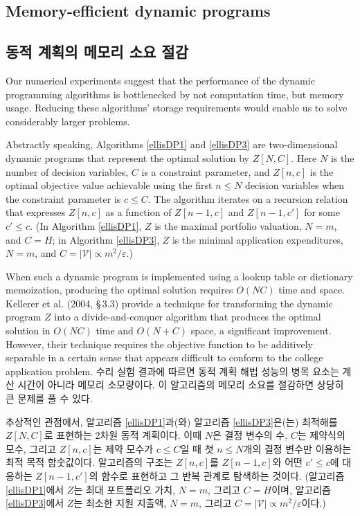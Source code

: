 \documentclass[11pt]{article} %
\theoremstyle{definition}
\theoremstyle{definition}
\begin{document}
\ifen \subsection{Memory-efficient dynamic programs}\else \subsection{동적 계획의 메모리 소요 절감}\fi
\ifen
Our numerical experiments suggest that the performance of the dynamic programming algorithms is bottlenecked by not computation time, but memory usage. Reducing these algorithms' storage requirements would enable us to solve considerably larger problems.

Abstractly speaking, Algorithms \ref{ellisDP1} and \ref{ellisDP3} are two-dimensional dynamic programs that represent the optimal solution by $Z[N, C]$. Here $N$ is the number of decision variables, $C$ is a constraint parameter, and $Z[n, c]$ is the optimal objective value achievable using the first $n\leq N$ decision variables when the constraint parameter is $c \leq C$. The algorithm iterates on a recursion relation that expresses $Z[n, c]$ as a function of $Z[n -1, c]$ and $Z[n -1, c']$ for some $c' \leq c$. (In Algorithm \ref{ellisDP1}, $Z$ is the maximal portfolio valuation, $N = m$, and $C =H$; in Algorithm \ref{ellisDP3},  $Z$ is the minimal application expenditures, $N = m$, and $C = |\mathcal{V}| \propto m^2 / \varepsilon$.)

When such a dynamic program is implemented using a lookup table or dictionary memoization, producing the optimal solution requires $O(NC)$ time and space. Kellerer et al. (2004, \S\,3.3) provide a technique for transforming the dynamic program $Z$ into a divide-and-conquer algorithm that produces the optimal solution in $O(N C)$ time and $O(N + C)$ space, a significant improvement. However, their technique requires the objective function to be additively separable in a certain sense that appears difficult to conform to the college application problem. 
\else
수리 실험 결과에 따르면 동적 계획 해법 성능의 병목 요소는 계산 시간이 아니라 메모리 소모량이다. 이 알고리즘의 메모리 소요를 절감하면 상당히 큰 문제를 풀 수 있다.

추상적인 관점에서, 알고리즘 \ref{ellisDP1}과(와) 알고리즘 \ref{ellisDP3}은(는) 최적해를 $Z[N, C]$로 표현하는 2차원 동적 계획이다. 이때 $N$은 결정 변수의 수, $C$는 제약식의 모수, 그리고 $Z[n, c]$는 제약 모수가 $c \leq C$일 때 첫 $n\leq N$개의 결정 변수만 이용하는 최적 목적 함숫값이다. 알고리즘의 구조는 $Z[n, c]$를 $Z[n -1, c]$와 어떤 $c' \leq c$에 대응하는 $Z[n -1, c']$의 함수로 표현하고 그 반복 관계로 탐색하는 것이다. (알고리즘 \ref{ellisDP1}에서 $Z$는 최대 포트폴리오 가치, $N = m$, 그리고 $C =H$이며, 알고리즘 \ref{ellisDP3}에서 $Z$는 최소한 지원 지출액, $N = m$, 그리고 $C= |\mathcal{V}| \propto m^2 / \varepsilon$이다.)
\end{document}

